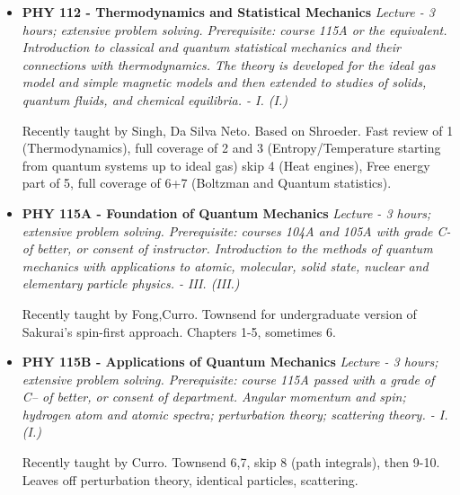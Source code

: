 \documentclass[12pt]{article}
\begin{document}
\begin{itemize}
\item {\bf PHY 112 - Thermodynamics and Statistical Mechanics}
{\it Lecture - 3 hours; extensive problem solving. Prerequisite: course 115A or the equivalent. Introduction to classical and quantum statistical mechanics and their connections with thermodynamics. The theory is developed for the ideal gas model and simple magnetic models and then extended to studies of solids, quantum fluids, and chemical equilibria. - I. (I.)}

Recently taught by Singh, Da Silva Neto.  Based on Shroeder.  
Fast review of 1 (Thermodynamics), full coverage of 2 and 3 (Entropy/Temperature starting from quantum systems up to ideal gas) skip 4 (Heat engines), Free energy part of 5, full coverage of 6+7 (Boltzman and Quantum statistics).

\item {\bf PHY 115A - Foundation of Quantum Mechanics}
{\it Lecture - 3 hours; extensive problem solving. Prerequisite: courses 104A and 105A with grade C- of better, or consent of instructor. Introduction to the methods of quantum mechanics with applications to atomic, molecular, solid state, nuclear and elementary particle physics. - III. (III.)} 

Recently taught by Fong,Curro.  Townsend for undergraduate version of Sakurai's spin-first approach.  Chapters 1-5, sometimes 6.

\item {\bf PHY 115B - Applications of Quantum Mechanics}
{\it Lecture - 3 hours; extensive problem solving. Prerequisite: course 115A passed with a grade of C– of better, or consent of department. Angular momentum and spin; hydrogen atom and atomic spectra; perturbation theory; scattering theory. - I. (I.)}

Recently taught by Curro.  Townsend 6,7, skip 8 (path integrals), then 9-10.
Leaves off perturbation theory, identical particles, scattering.

\end{itemize}
\end{document}
